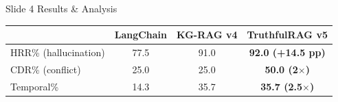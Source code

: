 \documentclass[aspectratio=169, 10pt]{beamer}
\begin{document}
\begin{frame}{Slide 4 \quad Results \& Analysis}
\vspace{6pt}
\centering\scriptsize
\begin{tabular}{lccc}
  \toprule
  & \textbf{LangChain} & \textbf{KG-RAG v4} & \textbf{TruthfulRAG v5}\\
  \midrule
  HRR\% (hallucination) & 77.5 & 91.0 & \textbf{92.0 (+14.5 pp)}\\
  CDR\% (conflict)      & 25.0 & 25.0 & \textbf{50.0 (2$\times$)}\\
  Temporal\%            & 14.3 & 35.7 & \textbf{35.7 (2.5$\times$)}\\
  \bottomrule
\end{tabular}

\end{frame}

\end{document}
